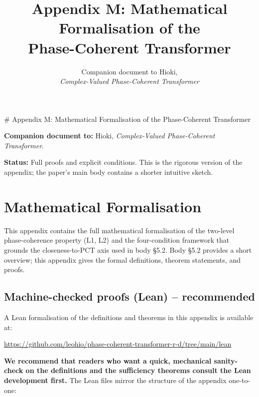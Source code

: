 \documentclass[11pt,a4paper]{article}
\title{\textbf{Appendix M: Mathematical Formalisation of the\\
Phase-Coherent Transformer}}
\author{Companion document to Hioki,\\
\textit{Complex-Valued Phase-Coherent Transformer}}
\date{}
\theoremstyle{plain}
\theoremstyle{definition}
\begin{document}
\maketitle
\frenchspacing
\# Appendix M: Mathematical Formalisation of the Phase-Coherent Transformer

\textbf{Companion document to:} Hioki, \emph{Complex-Valued Phase-Coherent Transformer}.

\textbf{Status:} Full proofs and explicit conditions. This is the rigorous version of the appendix; the paper's main body contains a shorter intuitive sketch.

\medskip

\section{Mathematical Formalisation}
This appendix contains the full mathematical formalisation of the two-level phase-coherence property (L1, L2) and the four-condition framework that grounds the closeness-to-PCT axis used in body \S{}5.2. Body \S{}5.2 provides a short overview; this appendix gives the formal definitions, theorem statements, and proofs.

\subsection{Machine-checked proofs (Lean) -- recommended}
A Lean formalisation of the definitions and theorems in this appendix is available at:

\url{https://github.com/leohio/phase-coherent-transformer-r-d/tree/main/lean}

\textbf{We recommend that readers who want a quick, mechanical sanity-check on the definitions and the sufficiency theorems consult the Lean development first.} The Lean files mirror the structure of the appendix one-to-one:
\end{document}
